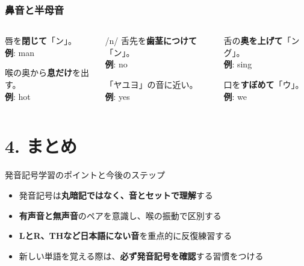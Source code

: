 \documentclass[aspectratio=169,xcolor={dvipsnames,table}]{beamer}
\newcommand{\gstyle}[1]{\textbf{\textcolor{primaryblue}{#1}}}
\begin{document}
\begin{frame}
    \frametitle{鼻音と半母音}
    \begin{columns}[T,totalwidth=\textwidth]
        \begin{column}{.3\textwidth}
            \begin{block}{}
                唇を\textbf{閉じて}「ン」。\\ \textbf{例}: man
            \end{block}
            \begin{block}{}
                喉の奥から\textbf{息だけ}を出す。\\ \textbf{例}: hot
            \end{block}
        \end{column}
        \begin{column}{.3\textwidth}
            \begin{block}{/n/}
                舌先を\textbf{歯茎につけて}「ン」。\\ \textbf{例}: no
            \end{block}
            \begin{block}{}
                「ヤユヨ」の音に近い。\\ \textbf{例}: yes
            \end{block}
        \end{column}
        \begin{column}{.3\textwidth}
            \begin{block}{}
                舌の\textbf{奥を上げて}「ング」。\\ \textbf{例}: sing
            \end{block}
            \begin{block}{}
                口を\textbf{すぼめて}「ウ」。\\ \textbf{例}: we
            \end{block}
        \end{column}
    \end{columns}
\end{frame}


\section{4. まとめ}

\begin{frame}{発音記号学習のポイントと今後のステップ}
    \begin{itemize}[circle]
        \item 発音記号は\gstyle{丸暗記ではなく、音とセットで理解}する
        \item \textbf{有声音と無声音}のペアを意識し、喉の振動で区別する
        \item \gstyle{LとR、THなど日本語にない音}を重点的に反復練習する
        \item 新しい単語を覚える際は、\textbf{必ず発音記号を確認}する習慣をつける
    \end{itemize}
\end{frame}
\end{document}
